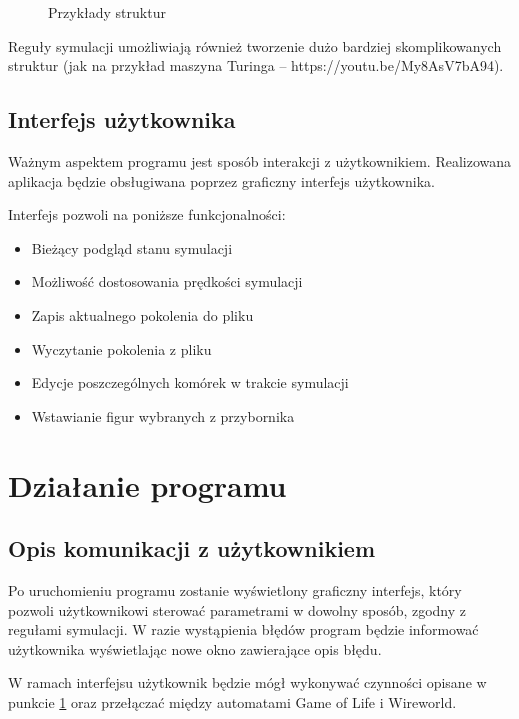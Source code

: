 \documentclass{report}
\begin{document}
\begin{figure}[h]
\centering
\setlength{\fboxsep}{0pt} %
\setlength{\fboxrule}{1pt} %
\caption{Przykłady struktur}
\end{figure}

Reguły symulacji umożliwiają również tworzenie dużo bardziej skomplikowanych struktur (jak na przykład maszyna Turinga -- https://youtu.be/My8AsV7bA94).

\section{Interfejs użytkownika}
\label{sec:opis-interfejs}
Ważnym aspektem programu jest sposób interakcji z użytkownikiem.
Realizowana aplikacja będzie obsługiwana poprzez graficzny interfejs użytkownika.

Interfejs pozwoli na poniższe funkcjonalności:
\begin{itemize}
    \item Bieżący podgląd stanu symulacji
    \item Możliwość dostosowania prędkości symulacji
    \item Zapis aktualnego pokolenia do pliku
    \item Wyczytanie pokolenia z pliku
    \item Edycje poszczególnych komórek w trakcie symulacji
    \item Wstawianie figur wybranych z przybornika
\end{itemize}

\chapter{Działanie programu}

\section{Opis komunikacji z użytkownikiem}
Po uruchomieniu programu zostanie wyświetlony graficzny interfejs, który pozwoli użytkownikowi sterować parametrami w dowolny sposób, zgodny z regułami symulacji. W razie wystąpienia błędów program będzie informować użytkownika wyświetlając nowe okno zawierające opis błędu.

W ramach interfejsu użytkownik będzie mógł wykonywać czynności opisane w punkcie \ref{sec:opis-interfejs} oraz przełączać między automatami Game of Life i Wireworld.
\end{document}
